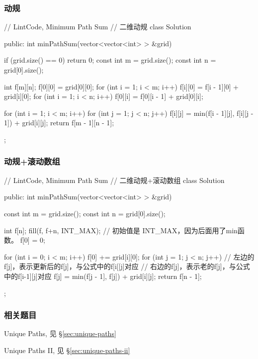 \subsubsection{动规}
\begin{Code}
// LintCode, Minimum Path Sum
// 二维动规
class Solution {
public:
    int minPathSum(vector<vector<int> > &grid) {
        if (grid.size() == 0) return 0;
        const int m = grid.size();
        const int n = grid[0].size();

        int f[m][n];
        f[0][0] = grid[0][0];
        for (int i = 1; i < m; i++) {
            f[i][0] = f[i - 1][0] + grid[i][0];
        }
        for (int i = 1; i < n; i++) {
            f[0][i] = f[0][i - 1] + grid[0][i];
        }

        for (int i = 1; i < m; i++) {
            for (int j = 1; j < n; j++) {
                f[i][j] = min(f[i - 1][j], f[i][j - 1]) + grid[i][j];
            }
        }
        return f[m - 1][n - 1];
    }
};
\end{Code}


\subsubsection{动规+滚动数组}
\begin{Code}
// LintCode, Minimum Path Sum
// 二维动规+滚动数组
class Solution {
public:
    int minPathSum(vector<vector<int> > &grid) {
        const int m = grid.size();
        const int n = grid[0].size();

        int f[n];
        fill(f, f+n, INT_MAX); // 初始值是 INT_MAX，因为后面用了min函数。
        f[0] = 0;

        for (int i = 0; i < m; i++) {
            f[0] += grid[i][0];
            for (int j = 1; j < n; j++) {
                // 左边的f[j]，表示更新后的f[j]，与公式中的f[i[[j]对应
                // 右边的f[j]，表示老的f[j]，与公式中的f[i-1][j]对应
                f[j] = min(f[j - 1], f[j]) + grid[i][j];
            }
        }
        return f[n - 1];
    }
};
\end{Code}

\subsubsection{相关题目}
\begindot
\item Unique Paths, 见 \S \ref{sec:unique-paths}
\item Unique Paths II, 见 \S \ref{sec:unique-paths-ii}
\myenddot


